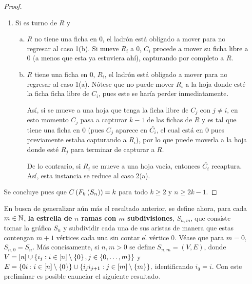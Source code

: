 \begin{proof}
\begin{enumerate}
        \item Si es turno de $R$ y
        \begin{enumerate}[(a)]
            \item $R$ no tiene una ficha en $0$, el ladr\'on est\'a obligado a mover
            para no regresar al caso 1(b). Si mueve $R_i$ a $0$, $C_i$ procede a
            mover su ficha libre a $0$ (a menos que esta ya estuviera ah\'i),
            capturando por completo a $R$.
            
            \item $R$ tiene una ficha en $0$, $R_i$, el ladr\'on est\'a obligado a
            mover para no regresar al caso 1(a). N\'otese que no puede mover $R_i$
            a la hoja donde est\'e la ficha ficha libre de $C_i$, pues este se
            har\'ia perder inmediatamente.
            
            As\'i, si se mueve a una hoja que tenga la ficha libre de $C_j$ con
            $j\neq i$, en esto momento $C_j$ pasa a capturar $k-1$ de las fichas
            de $R$ y es tal que tiene una ficha en $0$ (pues $C_j$ aparece en
            $\overline{C_i}$, el cual est\'a en $0$ pues previamente estaba
            capturando a $R_i$), por lo que puede moverla a la hoja donde est\'e
            $R_j$ para terminar de capturar a $R$.

            De lo contrario, si $R_i$ se mueve a una hoja vac\'ia, entonces
            $\overline{C_i}$ recaptura. As\'i, esta instancia se reduce al caso
            2(a).
        \end{enumerate}
    \end{enumerate}
    Se concluye pues que $C\left( F_k\left( S_n\right)\right)=k$ para todo $k\geq 2$ y $n\geq 2k-1$.
    
    
\end{proof}

En busca de generalizar a\'un m\'as el resultado anterior, se define ahora, para
cada $m\in \mathbb{N}$, \textbf{la estrella de $n$ ramas con $m$ subdivisiones},
$S_{n,m}$, que consiste tomar la gr\'afica $S_n$ y subdividir cada una de sus
aristas de manera que estas contengan $m+1$ v\'ertices cada una sin contar el
v\'ertice $0$. V\'ease que para $m=0$, $S_{n,0}=S_n$. M\'as concisamente, si $n,m > 0$
se define $S_{n,m}=(V,E)$, donde $V=\left[ n\right]\cup\left\{ i_j: i\in \left[ n\right]\setminus \left\{ 0\right\} ,
j\in \left\{ 0,\dots, m\right\}\right\}$ y $E=\left\{ 0i : i\in \left[ n\right]\setminus \left\{ 0\right\}\right\} \cup
\left\{ i_ji_{j+1}:j\in\left[ m\right]\setminus\left\{ m\right\}\right\}$, identificando $i_0=i$. Con este
preliminar es posible enunciar el siguiente resultado.

